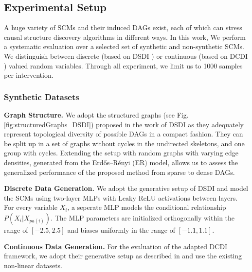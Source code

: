 \documentclass[nohyperref]{article}
\theoremstyle{plain}
\theoremstyle{definition}
\theoremstyle{remark}
\begin{document}

\clearpage
\subsection{Experimental Setup}

\label{app:synthDatasets}
A huge variety of SCMs and their induced DAGs exist, each of which can stress causal structure discovery algorithms in different ways. In this work, We perform a systematic evaluation over a selected set of synthetic and non-synthetic SCMs. We distinguish between discrete (based on DSDI \citep{ke2019learning}) or continuous (based on DCDI \citep{brouillard2020differentiable}) valued random variables. Through all experiment, we limit us to 1000 samples per intervention.

\subsubsection{Synthetic Datasets}
\textbf{Graph Structure.} We adopt the structured graphs (see Fig. \ref{fig:structuredGraphs_DSDI}) proposed in the work of DSDI \citep{ke2019learning} as they adequately represent topological diversity of possible DAGs in a compact fashion. They can be split up in a set of graphs without cycles in the undirected skeletons, and one group with cycles. Extending the setup with random graphs with varying edge densities, generated from the Erdős–Rényi (ER) model, allows us to assess the generalized performance of the proposed method from sparse to dense DAGs.

\textbf{Discrete Data Generation.} We adopt the generative setup of DSDI \citep{ke2019learning} and model the SCMs using two-layer MLPs with Leaky ReLU activations between layers. For every variable $X_i$, a seperate MLP models the conditional relationship $P(X_i|X_{pa(i)})$. The MLP parameters are initialized orthogonally within the range of $[-2.5, 2.5]$ and biases uniformly in the range of $[-1.1, 1.1]$. 


\textbf{Continuous Data Generation.} For the evaluation of the adapted DCDI framework, we adopt their generative setup as described in \citep{brouillard2020differentiable} and use the existing non-linear datasets.
\end{document}
